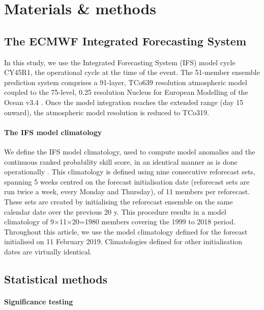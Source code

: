 \section{Materials \& methods}\label{ch3:methods}

  \subsection*{The ECMWF Integrated Forecasting System}

    In this study, we use the Integrated Forecasting System (IFS) model cycle CY45R1, the operational cycle at the time of the event. The 51-member ensemble prediction system comprises a 91-layer, TCo639 resolution atmospheric model coupled to the 75-level, 0.25\textdegree{} resolution Nucleus for European Modelling of the Ocean v3.4 \citep{ecmwf_ifs_2018}. Once the model integration reaches the extended range (day 15 onward), the atmospheric model resolution is reduced to TCo319.


    \paragraph{The IFS model climatology}

      We define the IFS model climatology, used to compute model anomalies and the continuous ranked probability skill score, in an identical manner as is done operationally \citep[for example, to calculate the Extreme Forecast Index product][]{ecmwf_ecmwf_2018}. This climatology is defined using nine consecutive reforecast sets, spanning 5 weeks centred on the forecast initialisation date (reforecast sets are run twice a week, every Monday and Thursday), of 11 members per reforecast. These sets are created by initialising the reforecast ensemble on the same calendar date over the previous 20 y. This procedure results in a model climatology of 9$\times$11$\times$20=1980 members covering the 1999 to 2018 period. Throughout this article, we use the model climatology defined for the forecast initialised on 11 February 2019. Climatologies defined for other initialisation dates are virtually identical.

  \subsection*{Statistical methods}

    \paragraph{Significance testing}

